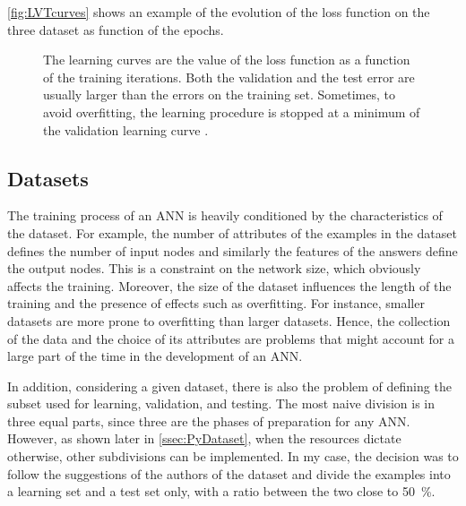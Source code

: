 \autoref{fig:LVTcurves} shows an example of the evolution of the loss function on the three dataset as function of the epochs.

\begin{figure}[htbp]
	\centering
	
	\caption{The learning curves are the value of the loss function as a function of the training iterations.
	Both the validation and the test error are usually larger than the errors on the training set.
	Sometimes, to avoid overfitting, the learning procedure is stopped at a minimum of the validation learning curve \cite{duda2012pattern}.
	}
	\label{fig:LVTcurves}
\end{figure}

\subsection{Datasets}
\label{ssec:Datasets}
The training process of an \acs{ANN} is heavily conditioned by the characteristics of the dataset.
For example, the number of attributes of the examples in the dataset defines the number of input nodes and similarly the features of the answers define the output nodes.
This is a constraint on the network size, which obviously affects the training.
Moreover, the size of the dataset influences the length of the training and the presence of effects such as overfitting.
For instance, smaller datasets are more prone to overfitting than larger datasets.
Hence, the collection of the data and the choice of its attributes are problems that might account for a large part of the time in the development of an \acs{ANN}.

In addition, considering a given dataset, there is also the problem of defining the subset used for learning, validation, and testing.
The most naive division is in three equal parts, since three are the phases of preparation for any \acs{ANN}.
However, as shown later in \autoref{ssec:PyDataset}, when the resources dictate otherwise, other subdivisions can be implemented.
In my case, the decision was to follow the suggestions of the authors of the dataset and divide the examples into a learning set and a test set only, with a ratio between the two close to \SI{50}{\percent}.

%

